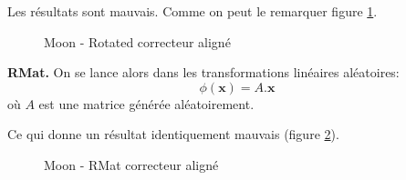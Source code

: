 Les résultats sont mauvais. Comme on peut le remarquer figure 
\ref{fig:moon_rotated_classwise}.

\begin{figure}[H] %
\centering
{}
\hfill
{}
\caption{Moon - Rotated correcteur aligné}
\label{fig:moon_rotated_classwise}
\end{figure}


{\Large\textbf{RMat.}} On se lance alors dans les transformations linéaires aléatoires:
$$ \phi(\pmb{x}) = A.\pmb{x}$$
où $A$ est une matrice générée aléatoirement.

Ce qui donne un résultat identiquement mauvais (figure \ref{fig:moon_rmat_classwise}).


\begin{figure}[H] %
\centering
{}
\hfill
{}
\caption{Moon - RMat correcteur aligné}
\label{fig:moon_rmat_classwise}
\end{figure}


